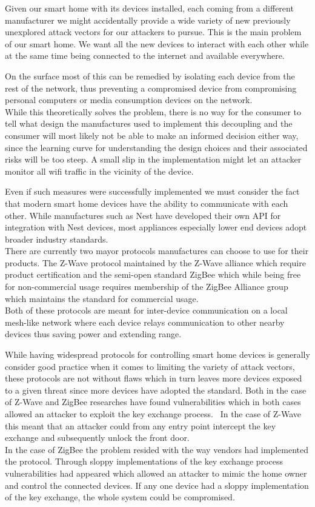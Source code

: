 \documentclass[12pt]{article}
\begin{document}
Given our smart home with its devices installed, each coming from a different manufacturer we might accidentally provide a wide variety of new previously unexplored attack vectors for our attackers to pursue. This is the main problem of our smart home. We want all the new devices to interact with each other while at the same time being connected to the internet and available everywhere. 

On the surface most of this can be remedied by isolating each device from the rest of the network, thus preventing a compromised device from compromising personal computers or media consumption devices on the network. \\
While this theoretically solves the problem, there is no way for the consumer to tell what design the manufactures used to implement this decoupling and the consumer will most likely not be able to make an informed decision either way, since the learning curve for understanding the design choices and their associated risks will be too steep. A small slip in the implementation might let an attacker monitor all wifi traffic in the vicinity of the device.

Even if such measures were successfully implemented we must consider the fact that modern smart home devices have the ability to communicate with each other. While manufactures such as Nest have developed their own API for integration with Nest devices, most appliances especially lower end devices adopt broader industry standards. \\
There are currently two mayor protocols manufactures can choose to use for their products. The Z-Wave protocol maintained by the Z-Wave alliance which require product certification and the semi-open standard ZigBee which while being free for non-commercial usage requires membership of the ZigBee Alliance group which maintains the standard for commercial usage. \\
Both of these protocols are meant for inter-device communication on a local mesh-like network where each device relays communication to other nearby devices thus saving power and extending range.

While having widespread protocols for controlling smart home devices is generally consider good practice when it comes to limiting the variety of attack vectors, these protocols are not without flaws which in turn leaves more devices exposed to a given threat since more devices have adopted the standard. Both in the case of Z-Wave and ZigBee researches have found vulnerabilities which in both cases allowed an attacker to exploit the key exchange process.~\cite{zigbee-defcon}\cite{zigbee-system-science}\cite{z-wave-sensepost} In the case of Z-Wave this meant that an attacker could from any entry point intercept the key exchange and subsequently unlock the front door. \\
In the case of ZigBee the problem resided with the way vendors had implemented the protocol. Through sloppy implementations of the key exchange process vulnerabilities had appeared which allowed an attacker to mimic the home owner and control the connected devices. If any one device had a sloppy implementation of the key exchange, the whole system could be compromised.
\end{document}
